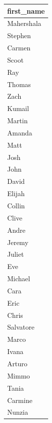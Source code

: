\documentclass[11pt,preprint]{elsarticle}
\let\origtable\table
\let\endorigtable\endtable
\renewenvironment{table}[1][2] {
    \expandafter\origtable\expandafter[H]
} {
    \endorigtable
}
\numberwithin{equation}{section}
\numberwithin{figure}{section}
\numberwithin{table}{section}
\begin{document}
\begin{Shaded}
\begin{Highlighting}[]
\OtherTok{\textless{}{-}} \NormalTok{(}\NormalTok{)}
\NormalTok{(}\NormalTok{)}
\end{Highlighting}
\end{Shaded}

\begin{table}
\centering
\caption{\label{tab:unnamed-chunk-8}Top Name Predictions}
\centering
\begin{tabular}[t]{l}
\hline
first\_name\\
\hline
Mahershala\\
\hline
Stephen\\
\hline
Carmen\\
\hline
Scoot\\
\hline
Ray\\
\hline
Thomas\\
\hline
Zach\\
\hline
Kumail\\
\hline
Martin\\
\hline
Amanda\\
\hline
Matt\\
\hline
Josh\\
\hline
John\\
\hline
David\\
\hline
Elijah\\
\hline
Collin\\
\hline
Clive\\
\hline
Andre\\
\hline
Jeremy\\
\hline
Juliet\\
\hline
Eve\\
\hline
Michael\\
\hline
Cara\\
\hline
Eric\\
\hline
Chris\\
\hline
Salvatore\\
\hline
Marco\\
\hline
Ivana\\
\hline
Arturo\\
\hline
Mimmo\\
\hline
Tania\\
\hline
Carmine\\
\hline
Nunzia\\

\end{tabular}
\end{table}
\end{document}

